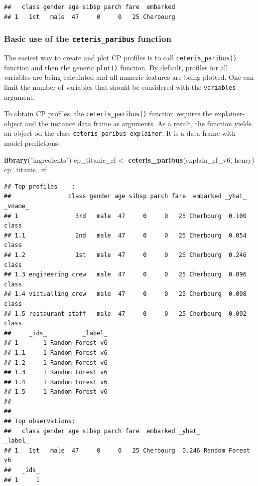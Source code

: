 \documentclass[12pt,]{krantz}
\newenvironment{Shaded}{\begin{snugshade}}{\end{snugshade}}
\newcommand{\KeywordTok}[1]{\textcolor[rgb]{0.13,0.29,0.53}{\textbf{#1}}}
\newcommand{\NormalTok}[1]{#1}
\newcommand{\StringTok}[1]{\textcolor[rgb]{0.31,0.60,0.02}{#1}}
\theoremstyle{definition}
\theoremstyle{definition}
\theoremstyle{definition}
\theoremstyle{remark}
\begin{document}
\begin{verbatim}
##   class gender age sibsp parch fare  embarked
## 1   1st   male  47     0     0   25 Cherbourg
\end{verbatim}

\hypertarget{basic-use-of-the-ceteris_paribus-function}{%
\subsubsection{\texorpdfstring{Basic use of the
\texttt{ceteris\_paribus}
function}{Basic use of the ceteris\_paribus function}}\label{basic-use-of-the-ceteris_paribus-function}}

The easiest way to create and plot CP profiles is to call
\texttt{ceteris\_paribus()} function and then the generic
\texttt{plot()} function. By default, profiles for all variables are
being calculated and all numeric features are being plotted. One can
limit the number of variables that should be considered with the
\texttt{variables} argument.

To obtain CP profiles, the \texttt{ceteris\_paribus()} function requires
the explainer-object and the instance data frame as arguments. As a
result, the function yields an object od the class
\texttt{ceteris\_paribus\_explainer}. It is a data frame with model
predictions.

\begin{Shaded}
\begin{Highlighting}[]
\KeywordTok{library}\NormalTok{(}\StringTok{"ingredients"}\NormalTok{)}
\NormalTok{cp_titanic_rf <-}\StringTok{ }\KeywordTok{ceteris_paribus}\NormalTok{(explain_rf_v6, henry)}
\NormalTok{cp_titanic_rf}
\end{Highlighting}
\end{Shaded}

\begin{verbatim}
## Top profiles    : 
##                class gender age sibsp parch fare  embarked _yhat_ _vname_
## 1                3rd   male  47     0     0   25 Cherbourg  0.100   class
## 1.1              2nd   male  47     0     0   25 Cherbourg  0.054   class
## 1.2              1st   male  47     0     0   25 Cherbourg  0.246   class
## 1.3 engineering crew   male  47     0     0   25 Cherbourg  0.096   class
## 1.4 victualling crew   male  47     0     0   25 Cherbourg  0.098   class
## 1.5 restaurant staff   male  47     0     0   25 Cherbourg  0.092   class
##     _ids_          _label_
## 1       1 Random Forest v6
## 1.1     1 Random Forest v6
## 1.2     1 Random Forest v6
## 1.3     1 Random Forest v6
## 1.4     1 Random Forest v6
## 1.5     1 Random Forest v6
## 
## 
## Top observations:
##   class gender age sibsp parch fare  embarked _yhat_          _label_
## 1   1st   male  47     0     0   25 Cherbourg  0.246 Random Forest v6
##   _ids_
## 1     1
\end{verbatim}
\end{document}
